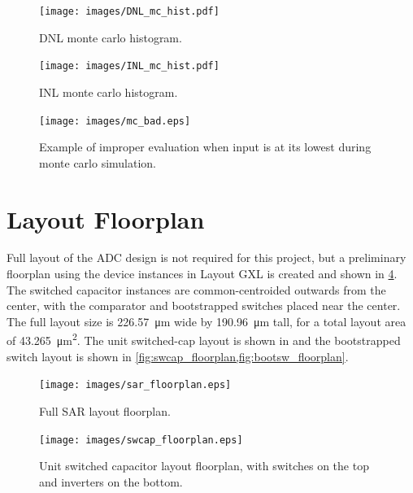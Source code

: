 \documentclass[11pt,letterpaper]{article}
\begin{document}
\begin{figure}[htbp!]
		\centering
	    \texttt{[image: images/DNL\_mc\_hist.pdf]}
		\caption{DNL monte carlo histogram.}\label{fig:dnl_hist}
\end{figure}

\begin{figure}[htbp!]
		\centering
	    \texttt{[image: images/INL\_mc\_hist.pdf]}
		\caption{INL monte carlo histogram.}\label{fig:inl_hist}
\end{figure}

\begin{figure}[htbp!]
		\centering
	    \texttt{[image: images/mc\_bad.eps]}
		\caption{Example of improper evaluation when input is at its lowest during monte carlo simulation.}\label{fig:mc_bad}
\end{figure}

\section{Layout Floorplan}

Full layout of the ADC design is not required for this project, but a preliminary floorplan using the device instances in Layout GXL is created and shown in \cref{fig:sar_floorplan}. The switched capacitor instances are common-centroided outwards from the center, with the comparator and bootstrapped switches placed near the center. The full layout size is \qty{226.57}{\um} wide by \qty{190.96}{\um} tall, for a total layout area of \qty{43,265}{\um\squared}. The unit switched-cap layout is shown in and the bootstrapped switch layout is shown in \cref{fig:swcap_floorplan,fig:bootsw_floorplan}.

\begin{figure}[htbp!]
		\centering
	    \texttt{[image: images/sar\_floorplan.eps]}
		\caption{Full SAR layout floorplan.}\label{fig:sar_floorplan}
\end{figure}

\begin{figure}[htbp!]
    \centering
    \texttt{[image: images/swcap\_floorplan.eps]}
    \caption{Unit switched capacitor layout floorplan, with switches on the top and inverters on the bottom.}\label{fig:swcap_floorplan}
\end{figure}
\end{document}

